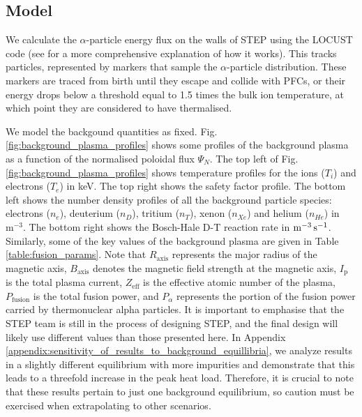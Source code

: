 \documentclass[10pt, a4paper, twoside]{article}
\begin{document}
\subsection{Model}
\label{sec:model}

We calculate the $\alpha$-particle energy flux on the walls of STEP using the LOCUST code (see \cite{akers2018, ward2021} for a more comprehensive explanation of how it works). This tracks particles, represented by markers that sample the $\alpha$-particle distribution. These markers are traced from birth until they escape and collide with PFCs, or their energy drops below a threshold equal to 1.5 times the bulk ion temperature, at which point they are considered to have thermalised. 

We model the backgound quantities as fixed. Fig. \ref{fig:background_plasma_profiles} shows some profiles of the background plasma as a function of the normalised poloidal flux $\Psi_N$. 
The top left of Fig. \ref{fig:background_plasma_profiles} shows temperature profiles for the ions ($T_i$) and electrons ($T_e$) in keV. 
The top right shows the safety factor profile. 
The bottom left shows the number density profiles of all the background particle species: electrons ($n_e$), deuterium ($n_D$), tritium ($n_T$), xenon ($n_{Xe}$) and helium ($n_{He}$) in $\text{m}^{-3}$. 
The bottom right shows the Bosch-Hale D-T reaction rate \cite{bosch1992} in $\text{m}^{-3}\text{\,s}^{-1}$. 
Similarly, some of the key values of the background plasma are given in Table \ref{table:fusion_params}. Note that  $R_{\text{axis}}$ represents the major radius of the magnetic axis, $B_{\text{axis}}$ denotes the magnetic field strength at the magnetic axis, $I_{\text{p}}$ is the total plasma current, $Z_{\text{eff}}$ is the effective atomic number of the plasma, $P_{\text{fusion}}$ is the total fusion power, and $P_{\alpha}$ represents the portion of the fusion power carried by thermonuclear alpha particles.
It is important to emphasise that the STEP team is still in the process of designing STEP, and the final design will likely use different values than those presented here. In Appendix \ref{appendix:sensitivity_of_results_to_background_equillibria}, we analyze results in a slightly different equilibrium with more impurities and demonstrate that this leads to a threefold increase in the peak heat load. Therefore, it is crucial to note that these results pertain to just one background equilibrium, so caution must be exercised when extrapolating to other scenarios.
\end{document}
